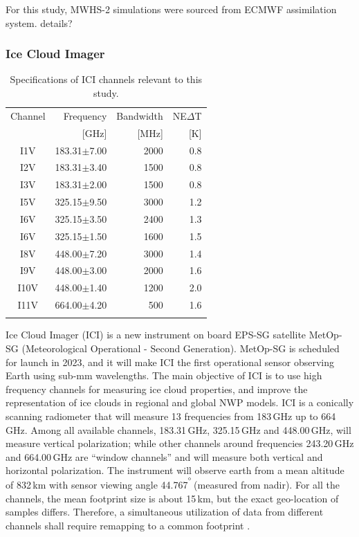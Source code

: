 \documentclass[amt, manuscript]{copernicus}
\newcommand{\todo}[1]{{\color{red} #1}}
\begin{document}
For this study, MWHS-2 simulations were sourced from ECMWF assimilation system. \todo{details?}

\subsubsection{Ice Cloud Imager}
%
\begin{table}[t]	
	\caption{Specifications of ICI channels relevant to this study.}
	\label{tab:ICI_MWI_channels}
	\begin{tabular}{crrr}
		\tophline
		Channel & Frequency 	& Bandwidth  	&NE$\Delta$T	\\
				& [GHz]			& [MHz]			& [K]			\\
		\middlehline
		I1V&	183.31$\pm$7.00    & 2000 			& 0.8 		\\
		I2V&	183.31$\pm$3.40    & 1500 			& 0.8 		\\
		I3V&	183.31$\pm$2.00    & 1500			& 0.8 		\\
		I5V&	325.15$\pm$9.50    & 3000			& 1.2 		\\
		I6V&	325.15$\pm$3.50    & 2400			& 1.3 		\\
		I6V&	325.15$\pm$1.50    & 1600			& 1.5 		\\
		I8V&	448.00$\pm$7.20    & 3000			& 1.4 		\\
		I9V&	448.00$\pm$3.00    & 2000			& 1.6 		\\
		I10V&	448.00$\pm$1.40    & 1200			& 2.0 		\\
		I11V&	664.00$\pm$4.20    & \phantom{0}500	& 1.6 		\\		
		\bottomhline
	\end{tabular}
	\belowtable{} %
\end{table}

Ice Cloud Imager (ICI) is a new instrument on board EPS-SG satellite MetOp-SG (Meteorological Operational - Second Generation). MetOp-SG is scheduled for launch in 2023, and it will make ICI the first operational sensor observing Earth using sub-mm wavelengths. The main objective of ICI is to use high frequency channels for measuring ice cloud properties, and improve the representation of ice clouds in regional and global NWP models. ICI is a conically scanning radiometer that will measure 13 frequencies from 183\,GHz up to 664\, GHz.  Among all available channels, 183.31\,GHz, 325.15\,GHz and 448.00\,GHz, will measure vertical polarization;  while other channels around frequencies 243.20\,GHz and 664.00\,GHz are ``window channels'' and will measure both vertical and horizontal polarization. The instrument will observe earth from a mean altitude of 832\,km with sensor viewing angle 44.767$^\unit{^{\degree}}$(measured from nadir). For all the channels, the mean footprint size is about 15\,km, but the exact geo-location of samples differs. Therefore, a simultaneous utilization of data from different channels shall require remapping to a common footprint \citep{eriksson:towar:20}.
\end{document}
